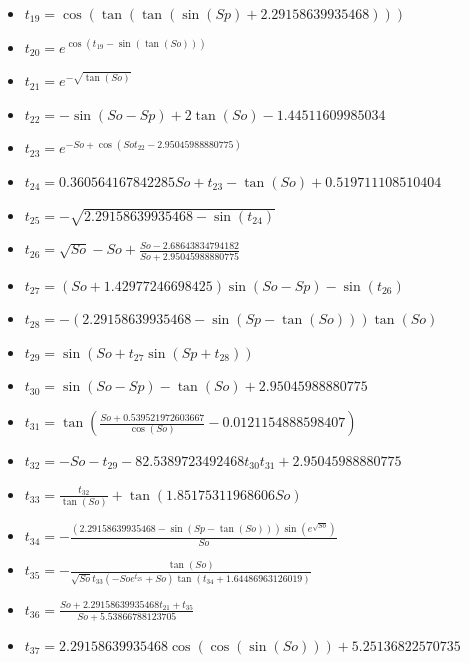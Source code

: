 \documentclass{article}
\begin{document}
\begin{itemize}
\item $t_{19} = \cos{\left(\tan{\left(\tan{\left(\sin{\left(Sp \right)} + 2.29158639935468 \right)} \right)} \right)}$
\item $t_{20} = e^{\cos{\left(t_{19} - \sin{\left(\tan{\left(So \right)} \right)} \right)}}$
\item $t_{21} = e^{- \sqrt{\tan{\left(So \right)}}}$
\item $t_{22} = - \sin{\left(So - Sp \right)} + 2 \tan{\left(So \right)} - 1.44511609985034$
\item $t_{23} = e^{- So + \cos{\left(So t_{22} - 2.95045988880775 \right)}}$
\item $t_{24} = 0.360564167842285 So + t_{23} - \tan{\left(So \right)} + 0.519711108510404$
\item $t_{25} = - \sqrt{2.29158639935468 - \sin{\left(t_{24} \right)}}$
\item $t_{26} = \sqrt{So} - So + \frac{So - 2.68643834794182}{So + 2.95045988880775}$
\item $t_{27} = \left(So + 1.42977246698425\right) \sin{\left(So - Sp \right)} - \sin{\left(t_{26} \right)}$
\item $t_{28} = - \left(2.29158639935468 - \sin{\left(Sp - \tan{\left(So \right)} \right)}\right) \tan{\left(So \right)}$
\item $t_{29} = \sin{\left(So + t_{27} \sin{\left(Sp + t_{28} \right)} \right)}$
\item $t_{30} = \sin{\left(So - Sp \right)} - \tan{\left(So \right)} + 2.95045988880775$
\item $t_{31} = \tan{\left(\frac{So + 0.539521972603667}{\cos{\left(So \right)}} - 0.0121154888598407 \right)}$
\item $t_{32} = - So - t_{29} - 82.5389723492468 t_{30} t_{31} + 2.95045988880775$
\item $t_{33} = \frac{t_{32}}{\tan{\left(So \right)}} + \tan{\left(1.85175311968606 So \right)}$
\item $t_{34} = - \frac{\left(2.29158639935468 - \sin{\left(Sp - \tan{\left(So \right)} \right)}\right) \sin{\left(e^{\sqrt{So}} \right)}}{So}$
\item $t_{35} = - \frac{\tan{\left(So \right)}}{\sqrt{So} t_{33} \left(- So e^{t_{25}} + So\right) \tan{\left(t_{34} + 1.64486963126019 \right)}}$
\item $t_{36} = \frac{So + 2.29158639935468 t_{21} + t_{35}}{So + 5.53866788123705}$
\item $t_{37} = 2.29158639935468 \cos{\left(\cos{\left(\sin{\left(So \right)} \right)} \right)} + 5.25136822570735$

\end{itemize}
\end{document}
